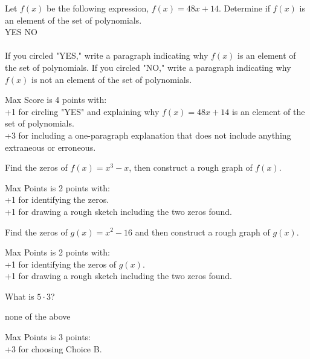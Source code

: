\documentclass[addpoints, answers]{exam}
\begin{document}
\newpage
\addpoints
	
\begin{questions}
\question [4] Let $f(x)$ be the following expression, $f(x)=48x+14$. Determine if $f(x)$ is an element of the set of polynomials.\bigskip \\YES \hspace{.5in}  NO\\\\
If you circled "YES," write a paragraph indicating why $f(x)$ is an element of the set of polynomials. If you circled "NO," write a paragraph  indicating why $f(x)$ is not an element of the set of polynomials.
\vspace{3.5in}
        
\begin{solution}
Max Score is 4 points with:\\
+1 for circling "YES" and explaining why $f(x)=48x+14$ is an element of the set of polynomials.\\
+3 for including a one-paragraph explanation that does not include anything extraneous or erroneous.
\end{solution}
        
\question[2] Find the zeros of $f(x)=x^3-x$, then construct a rough graph of $f(x)$.
\vfill
		
\begin{solution}
Max Points is 2 points with:\\ +1 for identifying the zeros.\\+1 for drawing a rough sketch including the two zeros found.
\end{solution}
        
\question[2] Find the zeros of $g(x)=x^2-16$ and then construct a rough graph of $g(x)$.
\vfill
        
\begin{solution}
Max Points is 2 points with:\\+1 for identifying the zeros of $g(x)$.\\+1 for drawing a rough sketch including the two zeros found.
\end{solution}
        
\newpage
\addpoints
	
\question[3] What is $5 \cdot 3$?\\
\begin{oneparchoices}
 \hspace{.25in}
\hspace{.25in}
\hspace{.25in}
\choice none of the above
\end{oneparchoices}
\answerline[B]
\bigskip
\begin{solution}
Max Points is 3 points:\\ +3 for choosing Choice B.
\end{solution}
	

\end{questions}
\end{document}
